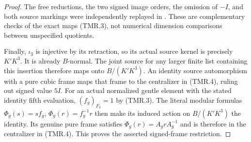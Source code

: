 \begin{proof}
The free reductions, the two signed image orders,
the omission of $-I$, and both source markings
were independently replayed in
.
These are complementary checks of the exact
maps (TMR.3), not numerical dimension comparisons
between unspecified quotients.

Finally, $\iota_3$ is injective by its retraction,
so its actual source kernel is precisely $K'K^3$.
It is already $B$-normal.  The joint source for
any larger finite list containing this insertion
therefore maps onto $B/(K'K^3)$.
An identity source automorphism with a pure
cubic frame maps that frame to the centralizer
in (TMR.4), ruling out signed value $5I$.
For an actual normalized gentle element with
the stated identity fifth evaluation,
$(f_g)_{F_3}=1$ by (TMR.3).
The literal modular formulas
$\Phi_g(s)=s f_g$, $\Phi_g(r)=f_g^{-1}r$
then make its induced action on $B/(K'K^3)$
the identity.  Its genuine pure frame satisfies
$\Phi_g(r)=A_g rA_g^{-1}$ and is therefore
in the centralizer in (TMR.4).
This proves the asserted signed-frame restriction.
\end{proof}
